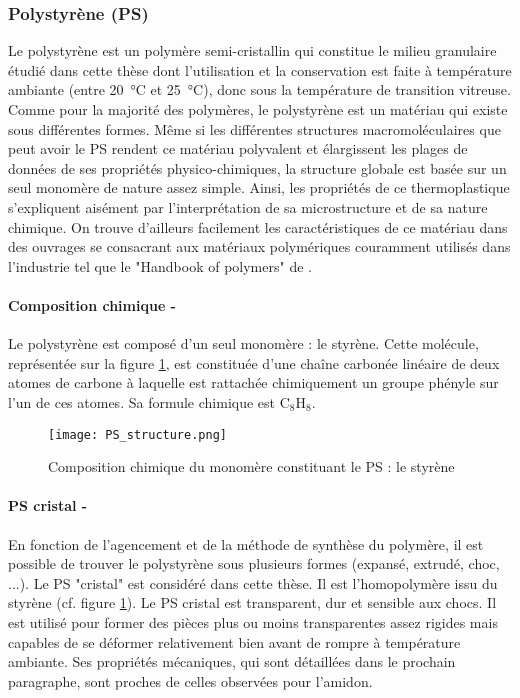		\subsubsection{Polystyrène (PS)} \label{para03:PS}
			Le polystyrène est un polymère semi-cristallin qui constitue le milieu granulaire étudié dans cette thèse dont l'utilisation et la conservation est faite à température ambiante (entre \SI{20}{\celsius} et \SI{25}{\celsius}), donc sous la température de transition vitreuse.
			Comme pour la majorité des polymères, le polystyrène est un matériau qui existe sous différentes formes. Même si les différentes structures macromoléculaires que peut avoir le PS rendent ce matériau polyvalent et élargissent les plages de données de ses propriétés physico-chimiques, la structure globale est basée sur un seul monomère de nature assez simple. Ainsi, les propriétés de ce thermoplastique s'expliquent aisément par l'interprétation de sa microstructure et de sa nature chimique. On trouve d'ailleurs facilement les caractéristiques de ce matériau dans des ouvrages se consacrant aux matériaux polymériques couramment utilisés dans l'industrie tel que le "Handbook of polymers" de \citet{wypych_handbook_2016}.
			\paragraph{Composition chimique -}
				Le polystyrène est composé d'un seul monomère : le styrène. Cette molécule, représentée sur la figure \ref{fig03:PS_structure}, est constituée d'une chaîne carbonée linéaire de deux atomes de carbone à laquelle est rattachée chimiquement un groupe phényle sur l'un de ces atomes. Sa formule chimique est $\textrm{C}_8\textrm{H}_8$.
				\begin{figure}\centering
					\texttt{[image: PS\_structure.png]}
					\caption{\label{fig03:PS_structure}Composition chimique du monomère constituant le PS : le styrène}
				\end{figure}
			\paragraph{PS cristal -}
				En fonction de l'agencement et de la méthode de synthèse du polymère, il est possible de trouver le polystyrène sous plusieurs formes (expansé, extrudé, choc, ...). Le PS "cristal" est considéré dans cette thèse. Il est l'homopolymère issu du styrène (cf. figure \ref{fig03:PS_structure}). Le PS cristal est transparent, dur et sensible aux chocs. Il est utilisé pour former des pièces plus ou moins transparentes assez rigides mais capables de se déformer relativement bien avant de rompre à température ambiante. Ses propriétés mécaniques, qui sont détaillées dans le prochain paragraphe, sont proches de celles observées pour l'amidon.
